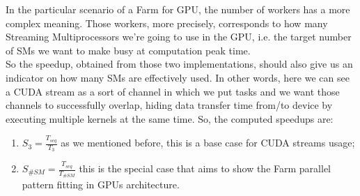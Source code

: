 In the particular scenario of a Farm for GPU, the number of workers has a more complex meaning. Those workers, more precisely, corresponds to how many Streaming Multiprocessors we're going to use in the GPU, i.e. the target number of SMs we want to make busy at computation peak time.\\
So the speedup, obtained from those two implementations, should also give us an indicator on how many SMs are effectively used.
In other words, here we can see a CUDA stream as a sort of channel in which we put tasks and we want those channels to successfully overlap, hiding data transfer time from/to device by executing multiple kernels at the same time.
So, the computed speedups are:
\begin{enumerate}
	\item \(S_{3} = \frac{T_{seq}}{T_{3}} \) as we mentioned before, this is a base case for CUDA streams usage;
	\item \(S_{\#SM} = \frac{T_{seq}}{T_{\#SM}} \) this is the special case that aims to show the Farm parallel pattern fitting in GPUs architecture.\\
\end{enumerate}

